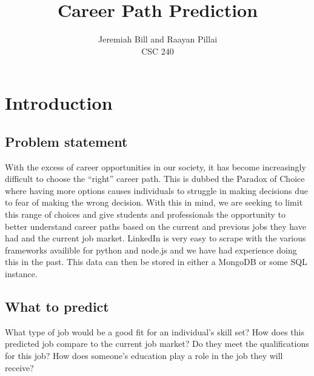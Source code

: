 \documentclass[12pt]{article}
\begin{document}
 
 
 
\title{
Career Path Prediction
}
\author{
Jeremiah Bill and Raayan Pillai %
\\
CSC 240 %
} %
 
\maketitle
 
\section{Introduction}
\subsection{Problem statement}
With the excess of career opportunities in our society, it has become increasingly difficult to choose the “right” career path. This is dubbed the Paradox of Choice  where having more options causes individuals to struggle in making decisions due to fear of making the wrong decision. With this in mind, we are seeking to limit this range of choices and give students and professionals the opportunity to better understand career paths based on the current and previous jobs they have had and the current job market. LinkedIn is very easy to scrape with the various frameworks availible for python and node.js and we have had experience doing this in the past. This data can then be stored in either a MongoDB or some SQL instance.

\subsection{What to predict}
What type of job would be a good fit for an individual's skill set?
How does this predicted job compare to the current job market?
Do they meet the qualifications for this job?
How does someone's education play a role in the job they will receive?
\end{document}
